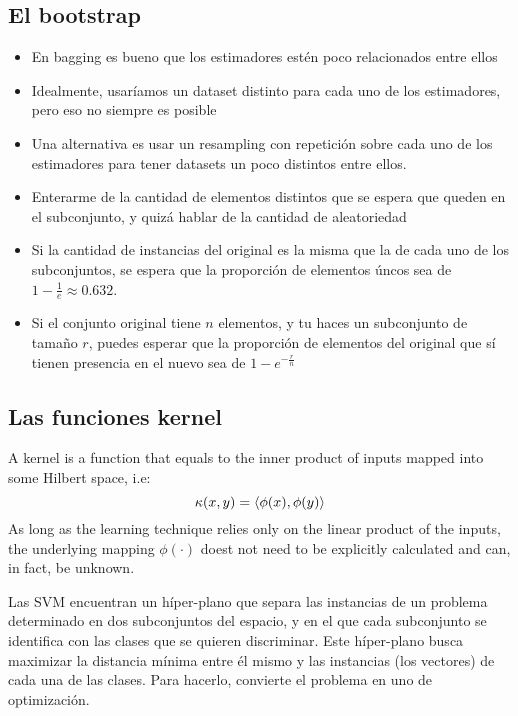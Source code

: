 \subsection{El bootstrap}
\begin{note}
\begin{itemize}
 \item En bagging es bueno que los estimadores estén poco relacionados
       entre ellos
 \item Idealmente, usaríamos un dataset distinto para cada uno de los
       estimadores, pero eso no siempre es posible
 \item Una alternativa es usar un resampling con repetición sobre cada
       uno de los estimadores para tener datasets un poco distintos entre ellos.
 \item Enterarme de la cantidad de elementos distintos que se espera que queden
       en el subconjunto, y quizá hablar de la cantidad de aleatoriedad
 \item Si la cantidad de instancias del original es la misma que la de cada uno
 de los subconjuntos, se espera que la proporción de elementos úncos sea de
 $1 - \frac{1}{e} \approx 0.632$.
 \item Si el conjunto original tiene $n$ elementos, y tu haces un subconjunto
 de tamaño $r$, puedes esperar que la proporción de elementos del original que
 sí tienen presencia en el nuevo sea de $1 - e^{-\frac{r}{n}}$


\end{itemize}
\end{note}
\subsection{Las funciones kernel}

\begin{note}
  A kernel is a function that equals to the inner product of inputs mapped into
  some Hilbert space, i.e:
  \begin{equation}
    \kappa(x,y) = \langle \phi(x), \phi(y) \rangle
  \end{equation}
  As long as the learning technique relies only on the linear product of the
  inputs, the underlying mapping $\phi(\cdot)$ doest not need to be explicitly
  calculated and can, in fact, be unknown.

  \cite{svm_rff}
\end{note}

Las SVM encuentran un híper-plano que separa las instancias de un problema
determinado en dos subconjuntos del espacio, y en el que cada subconjunto se
identifica con las clases que se quieren discriminar. Este híper-plano
busca maximizar la distancia mínima entre él mismo y las instancias (los vectores)
de cada una de las clases. Para hacerlo, convierte el problema en uno de
optimización.

